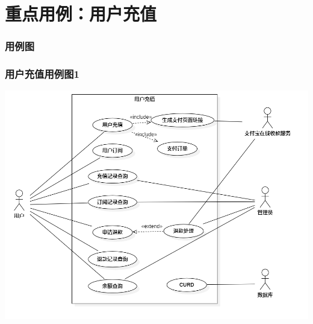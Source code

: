 \section{重点用例：用户充值}
\begin{frame}
    \frametitle{用例图}
    \frametitle{用户充值用例图1}
    \center
    \includegraphics[scale=0.3]{contents/figure/recharge_usecase_diagram.png}
\end{frame}